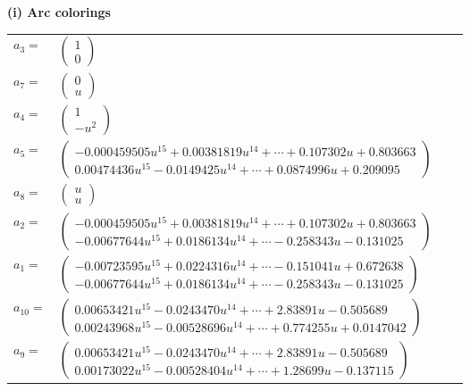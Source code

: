 \documentclass[1p]{elsarticle_modified}
\theoremstyle{definition}
\begin{document}
\flushleft \textbf{(i) Arc colorings}\\
\begin{tabular}{m{7pt} m{180pt} m{7pt} m{180pt} }
\flushright $a_{3}=$&$\begin{pmatrix}1\\0\end{pmatrix}$ \\
\flushright $a_{7}=$&$\begin{pmatrix}0\\u\end{pmatrix}$ \\
\flushright $a_{4}=$&$\begin{pmatrix}1\\- u^2\end{pmatrix}$ \\
\flushright $a_{5}=$&$\begin{pmatrix}-0.000459505 u^{15}+0.00381819 u^{14}+\cdots+0.107302 u+0.803663\\0.00474436 u^{15}-0.0149425 u^{14}+\cdots+0.0874996 u+0.209095\end{pmatrix}$ \\
\flushright $a_{8}=$&$\begin{pmatrix}u\\u\end{pmatrix}$ \\
\flushright $a_{2}=$&$\begin{pmatrix}-0.000459505 u^{15}+0.00381819 u^{14}+\cdots+0.107302 u+0.803663\\-0.00677644 u^{15}+0.0186134 u^{14}+\cdots-0.258343 u-0.131025\end{pmatrix}$ \\
\flushright $a_{1}=$&$\begin{pmatrix}-0.00723595 u^{15}+0.0224316 u^{14}+\cdots-0.151041 u+0.672638\\-0.00677644 u^{15}+0.0186134 u^{14}+\cdots-0.258343 u-0.131025\end{pmatrix}$ \\
\flushright $a_{10}=$&$\begin{pmatrix}0.00653421 u^{15}-0.0243470 u^{14}+\cdots+2.83891 u-0.505689\\0.00243968 u^{15}-0.00528696 u^{14}+\cdots+0.774255 u+0.0147042\end{pmatrix}$ \\
\flushright $a_{9}=$&$\begin{pmatrix}0.00653421 u^{15}-0.0243470 u^{14}+\cdots+2.83891 u-0.505689\\0.00173022 u^{15}-0.00528404 u^{14}+\cdots+1.28699 u-0.137115\end{pmatrix}$ \\

\end{tabular}
\end{document}

